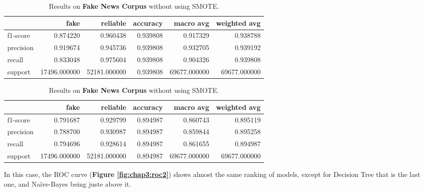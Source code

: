 \begin{table}
\begin{subtable}{\textwidth}
	\begin{tabular}{lrrrrr}
	\toprule
	{} &          fake &      reliable &  accuracy &     macro avg &  weighted avg \\
	\midrule
	f1-score  &      0.874220 &      0.960438 &  0.939808 &      0.917329 &      0.938788 \\
	precision &      0.919674 &      0.945736 &  0.939808 &      0.932705 &      0.939192 \\
	recall    &      0.833048 &      0.975604 &  0.939808 &      0.904326 &      0.939808 \\
	support   &  17496.000000 &  52181.000000 &  0.939808 &  69677.000000 &  69677.000000 \\
	\bottomrule
	\end{tabular}
	\caption{Raw results for Ridge Classifier on \textbf{Fake News Corpus}}
\end{subtable}

\begin{subtable}{\textwidth}
	\begin{tabular}{lrrrrr}
	\toprule
	{} &          fake &      reliable &  accuracy &     macro avg &  weighted avg \\
	\midrule
	f1-score  &      0.791687 &      0.929799 &  0.894987 &      0.860743 &      0.895119 \\
	precision &      0.788700 &      0.930987 &  0.894987 &      0.859844 &      0.895258 \\
	recall    &      0.794696 &      0.928614 &  0.894987 &      0.861655 &      0.894987 \\
	support   &  17496.000000 &  52181.000000 &  0.894987 &  69677.000000 &  69677.000000 \\
	\bottomrule
	\end{tabular}
	\caption{Raw results for Decision Tree on \textbf{Fake News Corpus}}
\end{subtable}
\caption{Results on \textbf{Fake News Corpus} without using SMOTE.}
\end{table}

In this case, the ROC curve (\textbf{Figure \ref{fig:chap3:roc2}}) shows almost the same ranking of models, except for Decision Tree that is the last one, and Na\"{i}ve-Bayes being juste above it. 

